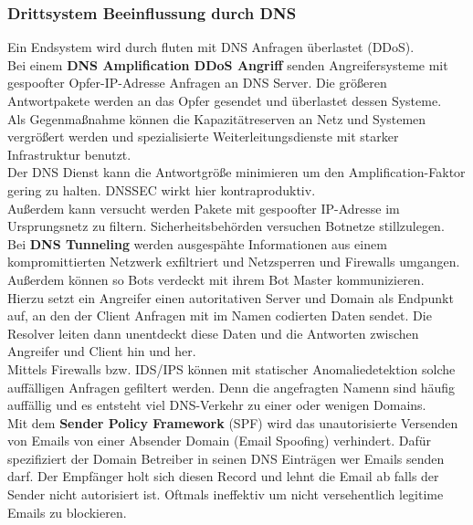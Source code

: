 \documentclass[a4paper,12pt,leqno]{article}
\begin{document}
\subsubsection{Drittsystem Beeinflussung durch DNS}

Ein Endsystem wird durch fluten mit DNS Anfragen überlastet (DDoS).\\
Bei einem \textbf{DNS Amplification DDoS Angriff} senden Angreifersysteme mit gespoofter Opfer-IP-Adresse Anfragen an DNS Server. Die größeren Antwortpakete werden an das Opfer gesendet und überlastet dessen Systeme.\\
Als Gegenmaßnahme können die Kapazitätreserven an Netz und Systemen vergrößert werden und spezialisierte Weiterleitungsdienste mit starker Infrastruktur benutzt.\\
Der DNS Dienst kann die Antwortgröße minimieren um den Amplification-Faktor gering zu halten. DNSSEC wirkt hier kontraproduktiv.\\
Außerdem kann versucht werden Pakete mit gespoofter IP-Adresse im Ursprungsnetz zu filtern. Sicherheitsbehörden versuchen Botnetze stillzulegen.\\

Bei \textbf{DNS Tunneling} werden ausgespähte Informationen aus einem kompromittierten Netzwerk exfiltriert und Netzsperren und Firewalls umgangen. Außerdem können so Bots verdeckt mit ihrem Bot Master kommunizieren.\\
Hierzu setzt ein Angreifer einen autoritativen Server und Domain als Endpunkt auf, an den der Client Anfragen mit im Namen codierten Daten sendet. Die Resolver leiten dann unentdeckt diese Daten und die Antworten zwischen Angreifer und Client hin und her.\\
Mittels Firewalls bzw. IDS/IPS können mit statischer Anomaliedetektion solche auffälligen Anfragen gefiltert werden. Denn die angefragten Namenn sind häufig auffällig und es entsteht viel DNS-Verkehr zu einer oder wenigen Domains.\\

Mit dem \textbf{Sender Policy Framework} (SPF) wird das unautorisierte Versenden von Emails von einer Absender Domain (Email Spoofing) verhindert. Dafür spezifiziert der Domain Betreiber in seinen DNS Einträgen wer Emails senden darf. Der Empfänger holt sich diesen Record und lehnt die Email ab falls der Sender nicht autorisiert ist. Oftmals ineffektiv um nicht versehentlich legitime Emails zu blockieren.
\end{document}
